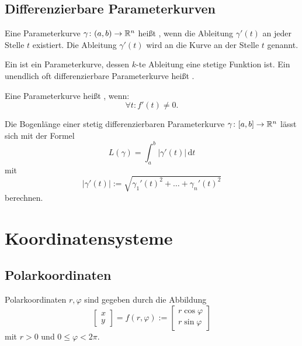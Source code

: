 \subsection{Differenzierbare Parameterkurven}

\begin{definition}
Eine Parameterkurve $\gamma\colon (a,b)\to\mathbb R^n$ heißt
, wenn die Ableitung $\gamma'(t)$ an jeder Stelle
$t$ existiert. Die Ableitung $\gamma'(t)$ wird
 an die Kurve an der Stelle $t$ genannt.

Ein  ist ein Parameterkurve, dessen $k$-te Ableitung
eine stetige Funktion ist. Ein unendlich oft differenzierbare
Parameterkurve heißt .

Eine Parameterkurve heißt , wenn:
\begin{equation}
\forall t\colon f'(t)\ne 0.
\end{equation}
\end{definition}

\noindent
{} Die Bogenlänge einer stetig differenzierbaren
Parameterkurve $\gamma\colon [a,b]\to\mathbb R^n$ lässt sich mit
der Formel
\begin{equation}
L(\gamma) = \int_a^b |\gamma'(t)|\,\mathrm dt
\end{equation}
mit
\begin{equation}
|\gamma'(t)| := \sqrt{\gamma_1'(t)^2+\ldots+\gamma_n'(t)^2}
\end{equation}
berechnen.

\section{Koordinatensysteme}
\subsection{Polarkoordinaten}
Polarkoordinaten $r,\varphi$ sind gegeben durch
die Abbildung%
\begin{equation}
\begin{bmatrix}x\\ y\end{bmatrix}
=f(r,\varphi)
:=\begin{bmatrix}
r\cos\varphi\\
r\sin\varphi
\end{bmatrix}
\end{equation}
mit $r>0$ und $0\le\varphi<2\pi$.

